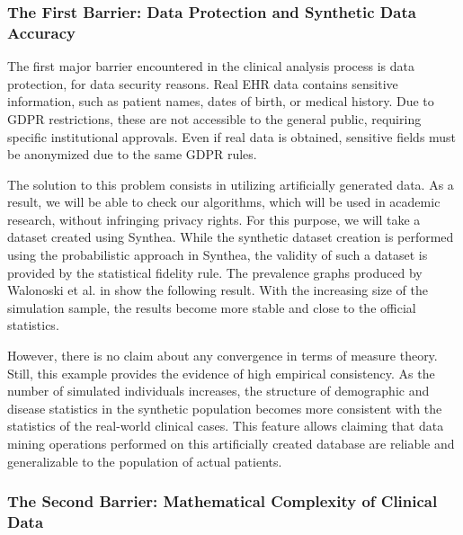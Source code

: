 \subsubsection*{The First Barrier: Data Protection and Synthetic Data Accuracy}

The first major barrier encountered in the clinical analysis process is data protection, for data security reasons. Real EHR data contains sensitive information, such as patient names, dates of birth, or medical history. Due to GDPR restrictions, these are not accessible to the general public, requiring specific institutional approvals. Even if real data is obtained, sensitive fields must be anonymized due to the same GDPR rules.

The solution to this problem consists in utilizing artificially generated data. As a result, we will be able to check our algorithms, which will be used in academic research, without infringing privacy rights. For this purpose, we will take a dataset created using Synthea. While the synthetic dataset creation is performed using the probabilistic approach in Synthea, the validity of such a dataset is provided by the statistical fidelity rule. The prevalence graphs produced by Walonoski et al. in \cite{walonoski2017} show the following result. With the increasing size of the simulation sample, the results become more stable and close to the official statistics.

However, there is no claim about any convergence in terms of measure theory. Still, this example provides the evidence of high empirical consistency. As the number of simulated individuals increases, the structure of demographic and disease statistics in the synthetic population becomes more consistent with the statistics of the real-world clinical cases. This feature allows claiming that data mining operations performed on this artificially created database are reliable and generalizable to the population of actual patients.

\subsubsection*{The Second Barrier: Mathematical Complexity of Clinical Data}

